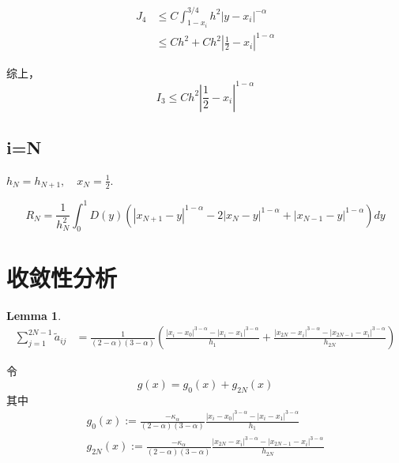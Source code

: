 \documentclass{ctexart}
\newtheorem{lemma}[theorem]{Lemma}
\theoremstyle{definition}
\theoremstyle{remark}
\numberwithin{equation}{section}
\begin{document}
\begin{equation}
    \begin{aligned}
        J_4 & \le C \int_{1-x_i}^{3/4} h^2 |y-x_i|^{-\alpha} \\
            & \le C h^2 + C h^2 |\frac{1}{2}-x_i|^{1-\alpha}
    \end{aligned}
\end{equation}

综上，
\begin{equation}
    I_3 \le C h^2 |\frac{1}{2}-x_i|^{1-\alpha}
\end{equation}




\newpage
\subsection{i=N}

\(h_N = h_{N+1}, \quad x_N = \frac{1}{2}\).

\begin{equation}
    R_N = \frac{1}{h_{N}^2} \int_0^1 D(y)
    (  |x_{N+1}-y|^{1-\alpha} - 2|x_{N}-y|^{1-\alpha} + |x_{N-1}-y|^{1-\alpha} )  dy
\end{equation}


\section{收敛性分析}




\begin{lemma}
    \begin{equation}
        \begin{aligned}
            \sum_{j=1}^{2N-1} \tilde{a}_{ij}
             & = \frac{1}{(2-\alpha)(3-\alpha)} \left( \frac{|x_i-x_0|^{3-\alpha} - |x_i-x_1|^{3-\alpha}}{h_1} + \frac{|x_{2N}-x_i|^{3-\alpha} - |x_{2N-1}-x_i|^{3-\alpha}}{h_{2N}} \right)
        \end{aligned}
    \end{equation}
\end{lemma}

令
\begin{equation}
    g(x) = g_{0}(x) + g_{2N}(x)
\end{equation}
其中
\begin{gather*}
    g_{0}(x) := \frac{-\kappa_\alpha}{(2-\alpha)(3-\alpha)} \frac{|x_i-x_0|^{3-\alpha} - |x_i-x_1|^{3-\alpha}}{h_1}    \\
    g_{2N}(x) := \frac{-\kappa_\alpha}{(2-\alpha)(3-\alpha)} \frac{|x_{2N}-x_i|^{3-\alpha} - |x_{2N-1}-x_i|^{3-\alpha}}{h_{2N}}
\end{gather*}
\end{document}

